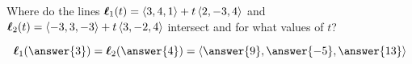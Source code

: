 \documentclass{ximera}
\author{Gregory Hartman \and Matthew Carr}
\begin{document}
\begin{exercise}




Where do the lines $\boldsymbol{\ell}_{1}(t)=\left\langle 3,4,1\right\rangle+t\left\langle 2,-3,4\right\rangle$ and $\boldsymbol{\ell}_{2}(t)=\left\langle -3,3,-3\right\rangle+t\left\langle 3,-2,4\right\rangle$ intersect and for what values of $t$?

\begin{prompt}
\[
\vecl_{1}(\answer{3})=\vecl_{2}(\answer{4})=\vector{\answer{9},\answer{-5},\answer{13}}
\]
\end{prompt}

\end{exercise}
\end{document}
